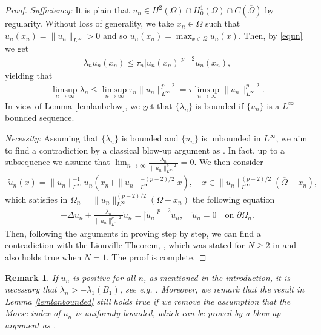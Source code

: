 \documentclass[10pt,a4paper]{article}
\newtheorem{remark}[theorem]{Remark}
\theoremstyle{definition} \theoremstyle{remark}
\numberwithin{equation}{section}
\newcommand{\la}{\lambda}
\begin{document}
\begin{proof}
	\emph{Sufficiency:}
	It is plain that $u_n \in H^2(\Omega) \cap H_0^1(\Omega) \cap C(\overline{\Omega})$ by regularity. Without loss of generality, we take $x_n \in \Omega$ such that $u_n(x_n) = \|u_n\|_{L^\infty} > 0$ and so $u_n(x_n) = \max_{x \in \Omega}u_n(x)$. Then, by \eqref{equn} we get
	\begin{align*}
		\la_n u_n(x_n) \le \tau_n |u_n(x_n)|^{p-2}u_n(x_n),
	\end{align*}
    yielding that
    \begin{align*}
    	\limsup_{n \to \infty}\la_n \le \limsup_{n \to \infty}\tau_n\|u_n\|_{L^\infty}^{p-2} = \bar\tau \limsup_{n \to \infty}\|u_n\|_{L^\infty}^{p-2}.
    \end{align*}
    In view of Lemma \ref{lemlanbelow}, we get that $\{\la_n\}$ is bounded if $\{u_n\}$ is a $L^\infty$-bounded sequence.

    \vskip0.1in
    \emph{Necessity:} Assuming that $\{\la_n\}$ is bounded and $\{u_n\}$ is unbounded in $L^\infty$, we aim to find a contradiction by a classical blow-up argument as \cite{BL2}. In fact, up to a subsequence we assume that $\lim_{n \to \infty}\frac{\la_n}{\|u_n\|_{L^\infty}^{p-2}} = 0$. We then consider
    \begin{align*}
    	\tilde u_n(x) = \|u_n\|_{L^\infty}^{-1}u_n(x_n + \|u_n\|_{L^\infty}^{-(p-2)/2}x), \quad x \in \|u_n\|_{L^\infty}^{(p-2)/2}(\overline{\Omega} - x_n),
    \end{align*}
    which satisfies in $\Omega_n = \|u_n\|_{L^\infty}^{(p-2)/2}(\Omega - x_n)$ the following equation
    \begin{align*}
    	- \Delta \tilde u_n + \frac{\la_n}{\|u_n\|_{L^\infty}^{p-2}}\tilde u_n = |\tilde u_n|^{p-2}\tilde u_n, \quad \tilde u_n = 0 \quad \text{on } \partial \Omega_n.
    \end{align*}
    Then, following the arguments in proving \cite[Theorem 2]{BL2} step by step, we can find a contradiction with the Liouville Theorem, \cite[Theorem 3]{BL2}, which was stated for $N \ge 2$ in \cite{BL2} and also holds true when $N =1$. The proof is complete.
\end{proof}

\begin{remark} \label{rmkpositive}
	If $u_n$ is positive for all $n$, as mentioned in the introduction, it is necessary that $\la_n > -\la_1(B_1)$, see e.g. \cite[Theorem 1.19]{Willem}. Moreover, we remark that the result in Lemma \ref{lemlanbounded} still holds true if we remove the assumption that the Morse index of $u_n$ is uniformly bounded, which can be proved by a blow-up argument as \cite{GS}.
\end{remark}
\end{document}
